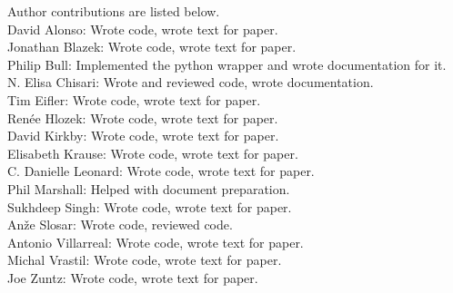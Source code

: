 Author contributions are listed below. \\
David Alonso: Wrote code, wrote text for paper. \\
Jonathan Blazek: Wrote code, wrote text for paper. \\
Philip Bull: Implemented the python wrapper and wrote documentation for it. \\
N. Elisa Chisari: Wrote and reviewed code, wrote documentation. \\
Tim Eifler: Wrote code, wrote text for paper. \\
Ren\'ee Hlozek: Wrote code, wrote text for paper. \\
David Kirkby: Wrote code, wrote text for paper. \\
Elisabeth Krause: Wrote code, wrote text for paper. \\
C. Danielle Leonard: Wrote code, wrote text for paper. \\
Phil Marshall: Helped with document preparation. \\
Sukhdeep Singh: Wrote code, wrote text for paper. \\
An\v{z}e Slosar: Wrote code, reviewed code. \\
Antonio Villarreal: Wrote code, wrote text for paper. \\
Michal Vrastil: Wrote code, wrote text for paper. \\
Joe Zuntz: Wrote code, wrote text for paper. \\
